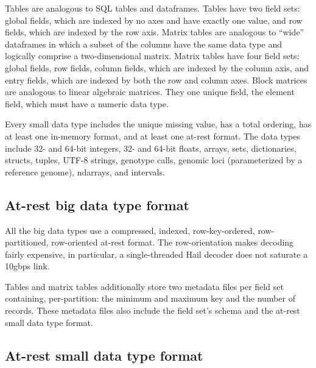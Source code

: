 \documentclass[10pt,a4paper%
]{article}
\begin{document}
Tables are analogous to SQL tables and dataframes. Tables have two field sets: global fields, which
are indexed by no axes and have exactly one value, and row fields, which are indexed by the row
axis. Matrix tables are analogous to ``wide'' dataframes in which a subset of the columns have the
same data type and logically comprise a two-dimensional matrix. Matrix tables have four field sets:
global fields, row fields, column fields, which are indexed by the column axis, and entry fields,
which are indexed by both the row and column axes. Block matrices are analogous to linear algebraic
matrices. They one unique field, the element field, which must have a numeric data type.

Every small data type includes the unique missing value, has a total ordering, has at least one
in-memory format, and at least one at-rest format. The data types include 32- and 64-bit integers,
32- and 64-bit floats, arrays, sets, dictionaries, structs, tuples, UTF-8 strings, genotype calls,
genomic loci (parameterized by a reference genome), ndarrays, and intervals.

\subsection{At-rest big data type format}

All the big data types use a compressed, indexed, row-key-ordered, row-partitioned, row-oriented
at-rest format. The row-orientation makes decoding fairly expensive, in particular, a
single-threaded Hail decoder does not saturate a 10gbps link.

Tables and matrix tables additionally store two metadata files per field set containing,
per-partition: the minimum and maximum key and the number of records. These metadata files also
include the field set's schema and the at-rest small data type format.

\subsection{At-rest small data type format}


\end{document}
